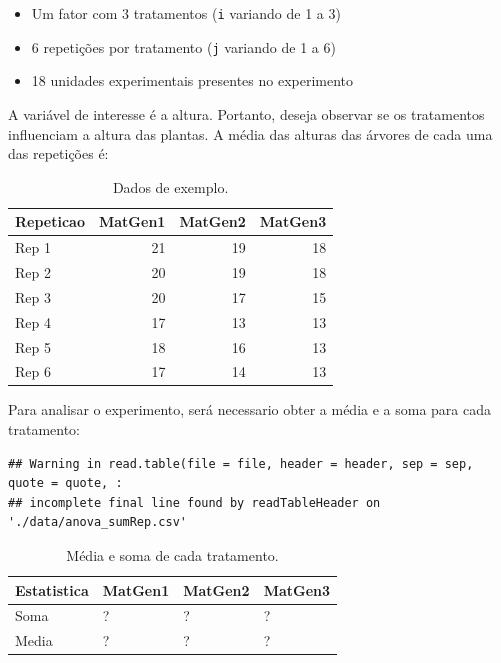 \documentclass[
]{article}
\providecommand{\tightlist}{%
  \setlength{\itemsep}{0pt}\setlength{\parskip}{0pt}}
\begin{document}
\begin{itemize}
\tightlist
\item
  Um fator com 3 tratamentos (\texttt{i} variando de 1 a 3)
\item
  6 repetições por tratamento (\texttt{j} variando de 1 a 6)
\item
  18 unidades experimentais presentes no experimento
\end{itemize}

A variável de interesse é a altura. Portanto, deseja observar se os tratamentos influenciam a altura das plantas. A média das alturas das árvores de cada uma das repetições é:

\begin{table}

\caption{\label{tab:unnamed-chunk-1}Dados de exemplo.}
\centering
\begin{tabular}[t]{l|r|r|r}
\hline
Repeticao & MatGen1 & MatGen2 & MatGen3\\
\hline
Rep 1 & 21 & 19 & 18\\
\hline
Rep 2 & 20 & 19 & 18\\
\hline
Rep 3 & 20 & 17 & 15\\
\hline
Rep 4 & 17 & 13 & 13\\
\hline
Rep 5 & 18 & 16 & 13\\
\hline
Rep 6 & 17 & 14 & 13\\
\hline
\end{tabular}
\end{table}

Para analisar o experimento, será necessario obter a média e a soma para cada tratamento:

\begin{verbatim}
## Warning in read.table(file = file, header = header, sep = sep, quote = quote, :
## incomplete final line found by readTableHeader on './data/anova_sumRep.csv'
\end{verbatim}

\begin{table}

\caption{\label{tab:unnamed-chunk-2}Média e soma de cada tratamento.}
\centering
\begin{tabular}[t]{l|l|l|l}
\hline
Estatistica & MatGen1 & MatGen2 & MatGen3\\
\hline
Soma & ? & ? & ?\\
\hline
Media & ? & ? & ?\\
\hline
\end{tabular}
\end{table}
\end{document}
